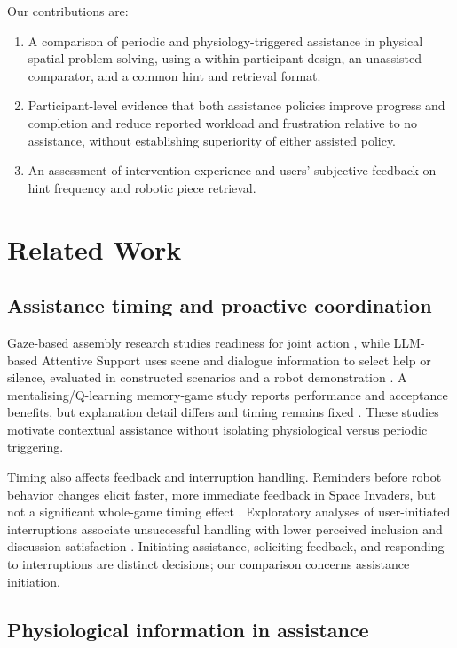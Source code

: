 \documentclass[sigconf,anonymous]{aamas}
\begin{document}
Our contributions are:
\begin{enumerate}
\item A comparison of periodic and physiology-triggered assistance in physical spatial problem solving, using a within-participant design, an unassisted comparator, and a common hint and retrieval format.
\item Participant-level evidence that both assistance policies improve progress and completion and reduce reported workload and frustration relative to no assistance, without establishing superiority of either assisted policy.
\item An assessment of intervention experience and users' subjective feedback on hint frequency and robotic piece retrieval.
\end{enumerate}

\section{Related Work}

\subsection{Assistance timing and proactive coordination}
Gaze-based assembly research studies readiness for joint action \cite{lavitnicora2024}, while LLM-based Attentive Support uses scene and dialogue information to select help or silence, evaluated in constructed scenarios and a robot demonstration \cite{tanneberg2024}. A mentalising/Q-learning memory-game study reports performance and acceptance benefits, but explanation detail differs and timing remains fixed \cite{andriella2025mentalising}. These studies motivate contextual assistance without isolating physiological versus periodic triggering.

Timing also affects feedback and interruption handling. Reminders before robot behavior changes elicit faster, more immediate feedback in Space Invaders, but not a significant whole-game timing effect \cite{candon2023}. Exploratory analyses of user-initiated interruptions associate unsuccessful handling with lower perceived inclusion and discussion satisfaction \cite{cao2025}. Initiating assistance, soliciting feedback, and responding to interruptions are distinct decisions; our comparison concerns assistance initiation.

\subsection{Physiological information in assistance}
\end{document}
